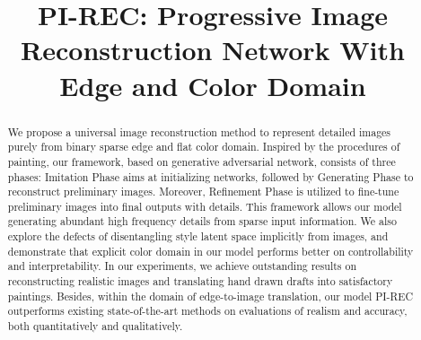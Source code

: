 \documentclass[10pt,twocolumn,letterpaper]{article} \usepackage{amsfonts,amssymb}
\makeatletter
\newcommand{\spewnotes}{\tfn@tablefootnoteprintout \global\let\tfn@tablefootnoteprintout\relax \gdef\tfn@fnt{?*?}}
\makeatother
\begin{document}
\title{PI-REC: Progressive Image Reconstruction Network With Edge and Color Domain}
\renewcommand{\thefootnote}{\fnsymbol{footnote}}

\spewnotes
\begin{abstract}
   We propose a universal image reconstruction method to represent detailed images purely from binary sparse edge and flat color domain. Inspired by the procedures of painting, our framework, based on generative adversarial network, consists of three phases: Imitation Phase aims at initializing networks, followed by Generating Phase to reconstruct preliminary images. Moreover, Refinement Phase is utilized to fine-tune preliminary images into final outputs with details. This framework allows our model ge\-ne\-rating abundant high frequency details from sparse input information. We also explore the defects of disentangling style latent space implicitly from images, and demonstrate that explicit color domain in our model performs better on controllability and interpretability. In our experiments, we achieve outstanding results on reconstructing realistic images and translating hand drawn drafts into satisfactory paintings. Besides, within the domain of edge-to-image translation, our model PI-REC outperforms existing state-of-the-art methods on evaluations of realism and accuracy, both quantitatively and qualitatively.
\end{abstract}
\end{document}

